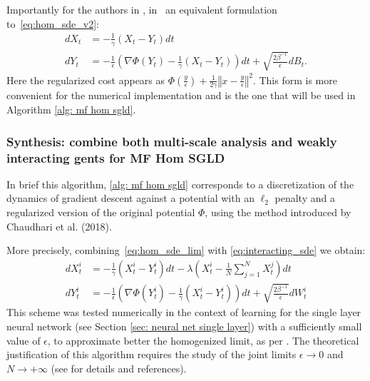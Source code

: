 \documentclass{article}
\begin{document}
Importantly for the authors in \cite{kantas2019sharpflatshallowweakly}, in~\cite{Chaudhari2017DeepRP} an equivalent formulation
to~\ref{eq:hom_sde_v2}: \begin{subequations}\label{eq:hom_sde}
\begin{align}
dX_{t} & =-\frac{1}{\gamma}(X_{t}-Y_{t})dt\label{eq:hom_sde1}\\
dY_{t} & =-\frac{1}{\epsilon}\left(\nabla\Phi(Y_{t})-\frac{1}{\gamma}(X_{t}-Y_{t})\right)dt+\sqrt{\frac{2\beta^{-1}}{\epsilon}}dB_{t}.\label{eq:hom_sde2}
\end{align}
\end{subequations} Here the regularized cost appears as $\Phi(\frac{y}{\epsilon})+\frac{1}{2\gamma}\left\Vert x-\frac{y}{\epsilon}\right\Vert ^{2}$.
This form is more convenient for the numerical implementation and
is the one that will be used in Algorithm \ref{alg: mf hom sgld}.


\subsubsection{Synthesis: combine both multi-scale analysis and weakly interacting gents for MF Hom SGLD}
In brief this algorithm, \ref{alg: mf hom sgld} corresponds to a discretization of the dynamics of gradient descent against a potential with an $ \ell_{2}$ penalty and a regularized version of the original potential $\Phi$, using the method introduced by Chaudhari et al. (2018).

More precisely, combining~\ref{eq:hom_sde_lim} with \ref{eq:interacting_sde}
we obtain: 
\begin{align}
dX_{t}^{i} & =-\frac{1}{\gamma}(X_{t}^{i}-Y_{t}^{i})dt-\lambda\left(X_{t}^{i}-\frac{1}{N}\sum_{j=1}^{N}X_{t}^{j}\right)dt\label{eq:hom_mf_sde1}\\
dY_{t}^{i} & =-\frac{1}{\epsilon}\left(\nabla\Phi(Y_{t}^{i})-\frac{1}{\gamma}(X_{t}^{i}-Y_{t}^{i})\right)dt+\sqrt{\frac{2\beta^{-1}}{\epsilon}}dW_{t}^{i}\label{eq:hom_mf_sde2}
\end{align}
This scheme was tested numerically in the context of learning for the single layer neural network (see Section \ref{sec: neural net single layer}) with a sufficiently small value of $\epsilon$,
to approximate better the homogenized limit, as per \cite{kantas2019sharpflatshallowweakly}. The theoretical justification of this algorithm requires the study of the joint limits $\epsilon\rightarrow0$
and $N\rightarrow+\infty$ (see \cite[p. 6]{kantas2019sharpflatshallowweakly} for details and references). \\ 
\end{document}

